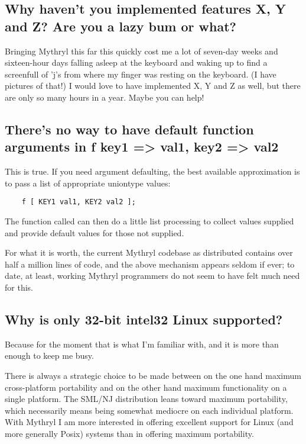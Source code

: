 \subsection{Why haven't you implemented features X, Y and Z?  Are you a lazy bum or what?}

Bringing Mythryl this far this quickly cost me a lot of seven-day weeks 
and sixteen-hour days falling asleep at the keyboard and waking up to 
find a screenfull of 'j's from where my finger was resting on the 
keyboard.  (I have pictures of that!)  I would love to have 
implemented X, Y and Z as well, but there are only so many hours in a 
year.  Maybe you can help!

\subsection{There's no way to have default function arguments in f { key1 => val1, key2 => val2 }}

This is true.  If you need argument defaulting, the best available 
approximation is to pass a list of appropriate uniontype values: 
\begin{verbatim}
    f [ KEY1 val1, KEY2 val2 ];
\end{verbatim}
The function called can then do a little list processing to collect 
values supplied and provide default values for those not supplied.

For what it is worth, the current Mythryl codebase as distributed 
contains over half a million lines of code, and the above mechanism 
appears seldom if ever;  to date, at least, working Mythryl programmers 
do not seem to have felt much need for this.

\subsection{Why is only 32-bit intel32 Linux supported?}

Because for the moment that is what I'm familiar with, and it is more 
than enough to keep me busy.

There is always a strategic choice to be made between on the one hand 
maximum cross-platform portability and on the other hand maximum 
functionality on a single platform.  The SML/NJ distribution leans 
toward maximum portability, which necessarily means being somewhat 
mediocre on each individual platform.  With Mythryl I am more 
interested in offering excellent support for Linux (and more generally 
Posix) systems than in offering maximum portability.

